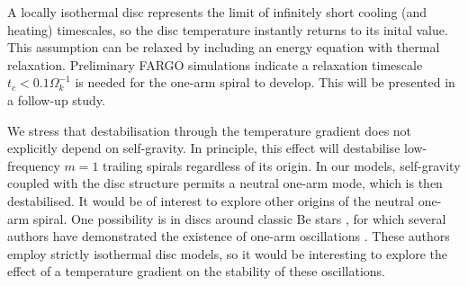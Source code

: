 A locally isothermal disc represents the limit of infinitely short
cooling (and heating) timescales, so the disc temperature instantly
returns to its inital value. %
This assumption can be relaxed by including an energy
equation with thermal relaxation. Preliminary FARGO simulations
indicate a relaxation timescale $t_c < 0.1\Omega_k^{-1}$ is needed for
the one-arm spiral to develop. This will be presented in a follow-up
study. %

We stress that destabilisation through the temperature gradient
does not explicitly depend on self-gravity. In principle, this effect
will destabilise low-frequency $m=1$ trailing spirals regardless of
its origin. In our models, self-gravity coupled with the disc
structure permits a neutral one-arm mode, which is then destabilised. 
It would be of interest to explore other origins of the neutral
one-arm spiral. One possibility is in discs around classic Be stars
\citep{rivinius13}, for which several authors have demonstrated the
existence of one-arm oscillations \citep[see e.g.][and references
therein]{okasaki97,papaloizou06c,ogilvie08}. These authors employ
strictly isothermal disc models, so it would be interesting to explore
the effect of a temperature gradient on the stability of these
oscillations. 

